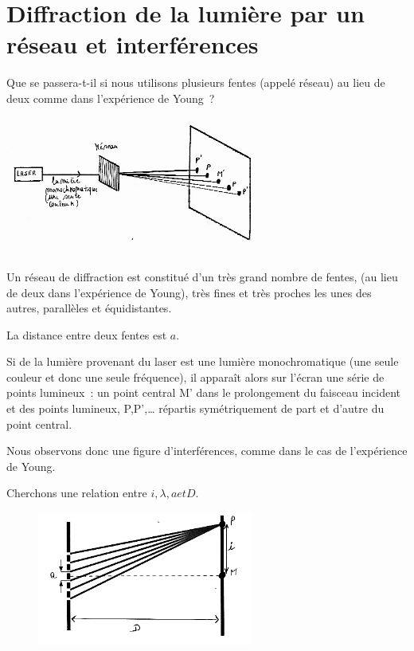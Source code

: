 \section{Diffraction de la lumière par un réseau et interférences}

Que se passera-t-il si nous utilisons plusieurs fentes (appelé réseau)
au lieu de deux comme dans l'expérience de Young~?

\includegraphics[width=8.565cm,height=4.546cm]{Pictures/10000001000002550000013DE02531D3FDE95D32.png}

Un réseau de diffraction est constitué d'un très grand nombre de fentes,
(au lieu de deux dans l'expérience de Young), très fines et très proches
les unes des autres, parallèles et équidistantes.

La distance entre deux fentes est $a$.

Si de la lumière provenant du laser est une lumière monochromatique (une
seule couleur et donc une seule fréquence), il apparaît alors sur
l'écran une série de points lumineux~: un point central M' dans le
prolongement du faisceau incident et des points lumineux, P,P',\ldots{}
répartis symétriquement de part et d'autre du point central.

Nous observons donc une figure d'interférences, comme dans le cas de
l'expérience de Young.

Cherchons une relation entre $i, \lambda, a et D.$

\begin{figure}
\centering
\includegraphics[width=7.086cm,height=4.389cm]{Pictures/10000001000001C400000118A4F6B6134DC391C7.png}
\caption{}
\end{figure}

